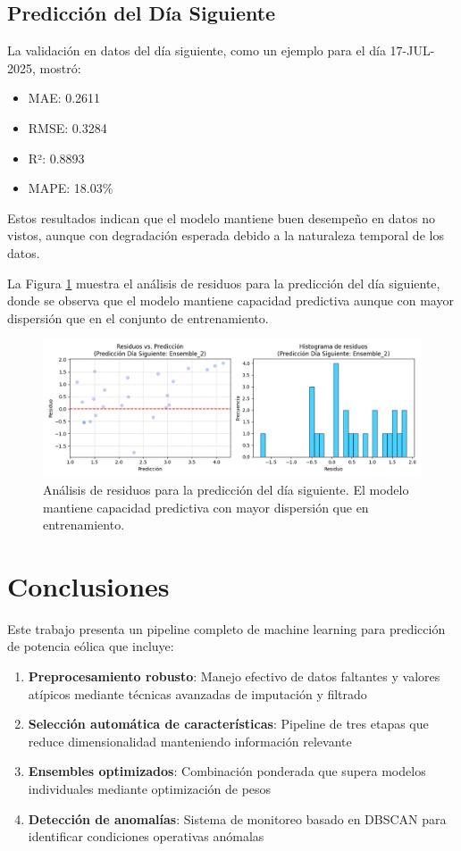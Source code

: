 \documentclass[conference]{IEEEtran}
\begin{document}
	\subsection{Predicción del Día Siguiente}
	La validación en datos del día siguiente, como un ejemplo para el día 17-JUL-2025, mostró:
	\begin{itemize}
		\item MAE: 0.2611
		\item RMSE: 0.3284
		\item R²: 0.8893
		\item MAPE: 18.03\%
	\end{itemize}
	
	Estos resultados indican que el modelo mantiene buen desempeño en datos no vistos, aunque con degradación esperada debido a la naturaleza temporal de los datos.
	
	La Figura \ref{fig:residuos_prediccion} muestra el análisis de residuos para la predicción del día siguiente, donde se observa que el modelo mantiene capacidad predictiva aunque con mayor dispersión que en el conjunto de entrenamiento.
	
	\begin{figure}[htbp]
		\centering
		\includegraphics[width=0.9\linewidth]{images/Figure_7.png}
		\caption{Análisis de residuos para la predicción del día siguiente. El modelo mantiene capacidad predictiva con mayor dispersión que en entrenamiento.}
		\label{fig:residuos_prediccion}
	\end{figure}
	
	\section{Conclusiones}
	
	Este trabajo presenta un pipeline completo de machine learning para predicción de potencia eólica que incluye:
	
	\begin{enumerate}
		\item \textbf{Preprocesamiento robusto}: Manejo efectivo de datos faltantes y valores atípicos mediante técnicas avanzadas de imputación y filtrado
		\item \textbf{Selección automática de características}: Pipeline de tres etapas que reduce dimensionalidad manteniendo información relevante
		\item \textbf{Ensembles optimizados}: Combinación ponderada que supera modelos individuales mediante optimización de pesos
		\item \textbf{Detección de anomalías}: Sistema de monitoreo basado en DBSCAN para identificar condiciones operativas anómalas
	\end{enumerate}
	
\end{document}
